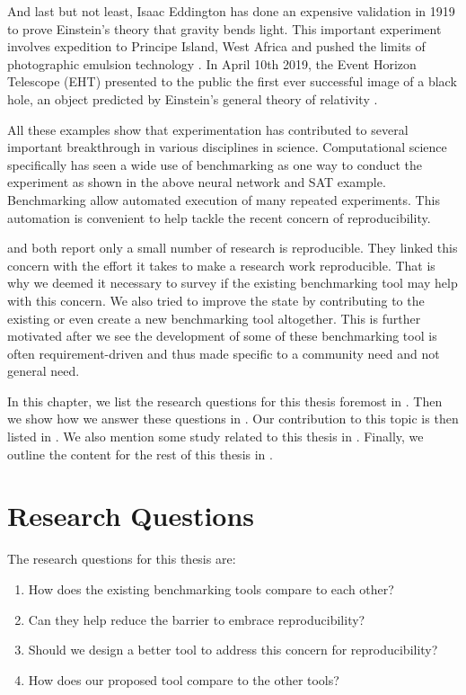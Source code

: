 And last but not least, Isaac Eddington has done an expensive validation in 1919 to prove Einstein's theory that gravity bends light.
This important experiment involves expedition to Principe Island, West Africa and pushed the limits of photographic emulsion technology \citep{tichyShouldComputerScientists1998}.
In April 10th 2019, the Event Horizon Telescope (EHT) presented to the public the first ever successful image of a black hole, an object predicted by Einstein's general theory of relativity \citep{akiyama2019first}.

All these examples show that experimentation has contributed to several important breakthrough in various disciplines in science.
Computational science specifically has seen a wide use of benchmarking as one way to conduct the experiment as shown in the above neural network and SAT example.
Benchmarking allow automated execution of many repeated experiments.
This automation is convenient to help tackle the recent concern of reproducibility.

\citet{gundersenStateArtReproducibility2018} and \citet{collbergRepeatabilityComputerSystems2016} both report only a small number of research is reproducible.
They linked this concern with the effort it takes to make a research work reproducible.
That is why we deemed it necessary to survey if the existing benchmarking tool may help with this concern.
We also tried to improve the state by contributing to the existing or even create a new benchmarking tool altogether.
This is further motivated after we see the development of some of these benchmarking tool is often requirement-driven and thus made specific to a community need and not general need.

In this chapter, we list the research questions for this thesis foremost in .
Then we show how we answer these questions in .
Our contribution to this topic is then listed in .
We also mention some study related to this thesis in .
Finally, we outline the content for the rest of this thesis in .

\section{Research Questions}
\label{sec:intro.questions}

The research questions for this thesis are:
\begin{enumerate}
	\item How does the existing benchmarking tools compare to each other?
	\item Can they help reduce the barrier to embrace reproducibility?
	\item Should we design a better tool to address this concern for reproducibility?
	\item How does our proposed tool compare to the other tools?
\end{enumerate}


